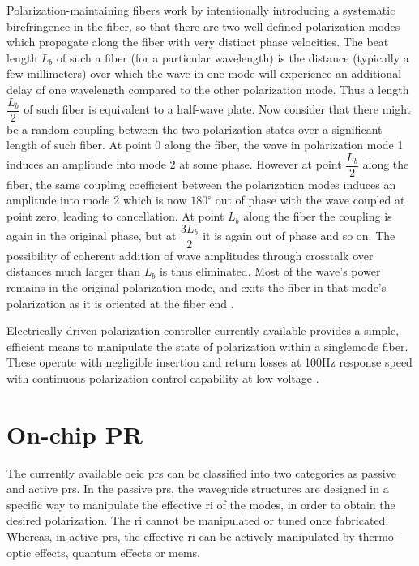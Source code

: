 \documentclass[../report.tex]{subfiles}
\begin{document}
Polarization-maintaining fibers work by intentionally introducing a systematic birefringence in the fiber, so that there are two well defined polarization modes which propagate along the fiber with very distinct phase velocities. The beat length $L_b$ of such a fiber (for a particular wavelength) is the distance (typically a few millimeters) over which the wave in one mode will experience an additional delay of one wavelength compared to the other polarization mode. Thus a length $\dfrac{L_b}{2}$ of such fiber is equivalent to a half-wave plate. Now consider that there might be a random coupling between the two polarization states over a significant length of such fiber. At point 0 along the fiber, the wave in polarization mode 1 induces an amplitude into mode 2 at some phase. However at point $\dfrac{L_b}{2}$ along the fiber, the same coupling coefficient between the polarization modes induces an amplitude into mode 2 which is now $180^\circ$ out of phase with the wave coupled at point zero, leading to cancellation. At point $L_b$ along the fiber the coupling is again in the original phase, but at $\dfrac{3L_b}{2}$ it is again out of phase and so on. The possibility of coherent addition of wave amplitudes through crosstalk over distances much larger than $L_b$ is thus eliminated. Most of the wave's power remains in the original polarization mode, and exits the fiber in that mode's polarization as it is oriented at the fiber end \cite{polarization_maintaining_fiber}. \par	

Electrically driven polarization controller currently available provides a simple, efficient means to manipulate the state of polarization within a singlemode fiber. These operate with negligible insertion and return losses at 100Hz response speed with continuous polarization control capability at low voltage \cite{polarization_maintaining_device}.
		
	\section{On-chip PR}
The currently available \gls{oeic} \gls{pr}s can be classified into two categories as passive and active \gls{pr}s. In the passive \gls{pr}s, the waveguide structures are designed in a specific way to manipulate the effective \gls{ri} of the modes, in order to obtain the desired polarization. The \gls{ri} cannot be manipulated or tuned once fabricated. Whereas, in active \gls{pr}s, the effective \gls{ri} can be actively manipulated by thermo-optic effects, quantum effects or \gls{mems}.
	
\end{document}
